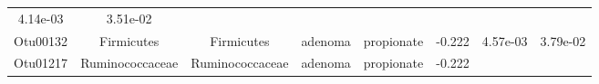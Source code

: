 \documentclass[11pt,]{article}
\begin{document}
\begin{longtable}[]{@{}cccccccc@{}}
\begin{minipage}[t]{0.08\columnwidth}
4.14e-03\strut
\end{minipage} & \begin{minipage}[t]{0.08\columnwidth}\centering\strut
3.51e-02\strut
\end{minipage}\tabularnewline
\begin{minipage}[t]{0.08\columnwidth}\centering\strut
Otu00132\strut
\end{minipage} & \begin{minipage}[t]{0.15\columnwidth}\centering\strut
Firmicutes\strut
\end{minipage} & \begin{minipage}[t]{0.15\columnwidth}\centering\strut
Firmicutes\strut
\end{minipage} & \begin{minipage}[t]{0.08\columnwidth}\centering\strut
adenoma\strut
\end{minipage} & \begin{minipage}[t]{0.09\columnwidth}\centering\strut
propionate\strut
\end{minipage} & \begin{minipage}[t]{0.07\columnwidth}\centering\strut
-0.222\strut
\end{minipage} & \begin{minipage}[t]{0.08\columnwidth}\centering\strut
4.57e-03\strut
\end{minipage} & \begin{minipage}[t]{0.08\columnwidth}\centering\strut
3.79e-02\strut
\end{minipage}\tabularnewline
\begin{minipage}[t]{0.08\columnwidth}\centering\strut
Otu01217\strut
\end{minipage} & \begin{minipage}[t]{0.15\columnwidth}\centering\strut
Ruminococcaceae\strut
\end{minipage} & \begin{minipage}[t]{0.15\columnwidth}\centering\strut
Ruminococcaceae\strut
\end{minipage} & \begin{minipage}[t]{0.08\columnwidth}\centering\strut
adenoma\strut
\end{minipage} & \begin{minipage}[t]{0.09\columnwidth}\centering\strut
propionate\strut
\end{minipage} & \begin{minipage}[t]{0.07\columnwidth}\centering\strut
-0.222\strut
\end{minipage} & \begin{minipage}[t]{0.08\columnwidth}\centering\strut

\end{minipage}
\end{longtable}
\end{document}
